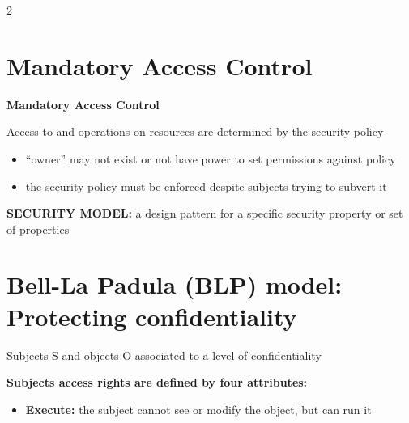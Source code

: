 \documentclass[a4paper,9pt]{extarticle}
\begin{document}

\thispagestyle{fancy}



\begin{multicols}{2}


\section{Mandatory Access Control}


\begin{definition}

\textbf{Mandatory Access Control}

Access to and operations on resources are determined by the security policy

\begin{itemize}

\item ``owner'' may not exist or not have power to set permissions against policy

\item the security policy must be enforced despite subjects trying to subvert it

\end{itemize}

\end{definition}


\begin{definition}

\textbf{SECURITY MODEL:} a design pattern for a specific security
property or set of properties

\end{definition}



\section{Bell-La Padula (BLP) model: Protecting confidentiality}


Subjects S and objects O associated to a level of confidentiality

\textbf{Subjects access rights are defined by four attributes:}

\begin{itemize}

\item \textbf{Execute:} the subject cannot see or modify the object, but can run it


\end{itemize}
\end{multicols}
\end{document}
